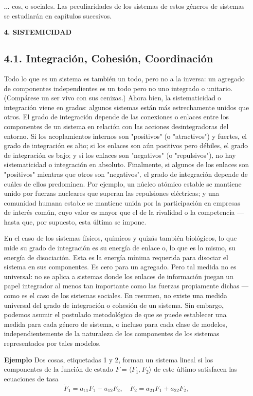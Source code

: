 {\fontsize{13}{15}\selectfont
... cos, o sociales. Las peculiaridades de los sistemas de estos géneros de sistemas se estudiarán en capítulos sucesivos.

\vspace{0.5cm}
\begin{center}
{\fontsize{13}{16}\selectfont \textbf{4. SISTEMICIDAD}}
\end{center}
\vspace{0.5cm}

\subsection*{4.1. Integración, Cohesión, Coordinación}

Todo lo que es un sistema es también un todo, pero no a la inversa: un agregado de componentes independientes es un todo pero no uno integrado o unitario. (Compárese un ser vivo con sus cenizas.) Ahora bien, la sistematicidad o integración viene en grados: algunos sistemas están más estrechamente unidos que otros. El grado de integración depende de las conexiones o enlaces entre los componentes de un sistema en relación con las acciones desintegradoras del entorno. Si los acoplamientos internos son "positivos" (o "atractivos") y fuertes, el grado de integración es alto; si los enlaces son aún positivos pero débiles, el grado de integración es bajo; y si los enlaces son "negativos" (o "repulsivos"), no hay sistematicidad o integración en absoluto. Finalmente, si algunos de los enlaces son "positivos" mientras que otros son "negativos", el grado de integración depende de cuáles de ellos predominen. Por ejemplo, un núcleo atómico estable se mantiene unido por fuerzas nucleares que superan las repulsiones eléctricas; y una comunidad humana estable se mantiene unida por la participación en empresas de interés común, cuyo valor es mayor que el de la rivalidad o la competencia —hasta que, por supuesto, esta última se impone.

En el caso de los sistemas físicos, químicos y quizás también biológicos, lo que mide su grado de integración es su energía de enlace o, lo que es lo mismo, su energía de disociación. Esta es la energía mínima requerida para disociar el sistema en sus componentes. Es cero para un agregado. Pero tal medida no es universal: no se aplica a sistemas donde los enlaces de información juegan un papel integrador al menos tan importante como las fuerzas propiamente dichas —como es el caso de los sistemas sociales. En resumen, no existe una medida universal del grado de integración o cohesión de un sistema. Sin embargo, podemos asumir el postulado metodológico de que se puede establecer una medida para cada género de sistema, o incluso para cada clase de modelos, independientemente de la naturaleza de los componentes de los sistemas representados por tales modelos.

\textbf{Ejemplo} Dos cosas, etiquetadas 1 y 2, forman un sistema lineal si los componentes de la función de estado \( F = \langle F_1, F_2 \rangle \) de este último satisfacen las ecuaciones de tasa
\[\dot{F}_1 = a_{11}F_1 + a_{12}F_2, \quad \dot{F}_2 = a_{21}F_1 + a_{22}F_2,\]
}

